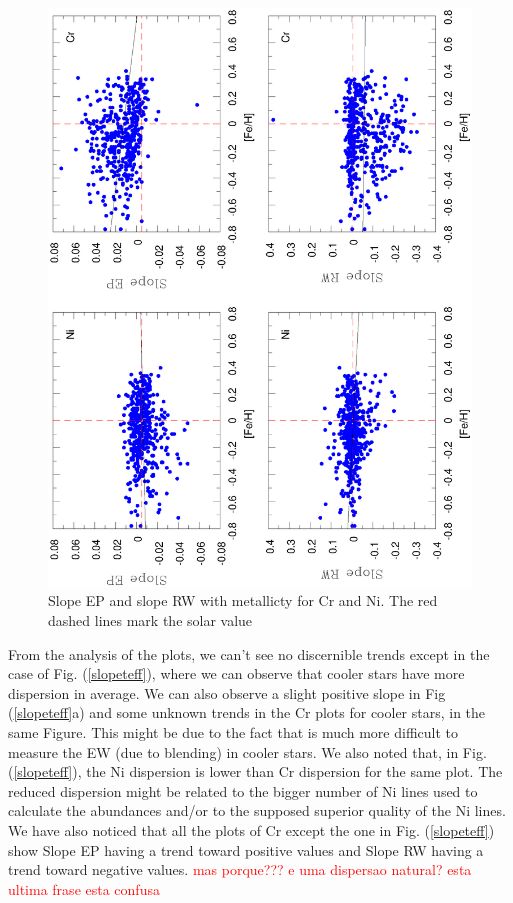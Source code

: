 \documentclass[dvips,12pt,a4paper]{report}
\begin{document}
{{\begin{figure}[h]
\centering
\includegraphics[width=10 cm, angle=-90]{pics/uncertain/feh.eps}
\caption[Slope EP and slope RW with feh for Cr and Ni]{Slope EP and slope RW with metallicty for Cr and Ni. The red dashed lines mark the solar value}
\label{slopefeh}
\end{figure}

From the analysis of the plots, we can't see no discernible trends except in the case of Fig. (\ref{slopeteff}), where we can observe that cooler stars  have more dispersion in average. We can also observe a slight positive slope in Fig (\ref{slopeteff}a) and some unknown trends in the Cr plots for cooler stars, in the same Figure. This might be due to the fact that is much more difficult to measure the EW (due to blending) in cooler stars. We also noted that, in Fig. (\ref{slopeteff}), the Ni dispersion is lower than Cr dispersion for the same plot. The reduced dispersion might be related to the bigger number of Ni lines used to calculate the abundances and/or to the supposed superior quality of the Ni lines. We have also noticed that all the plots of Cr except the one in Fig. (\ref{slopeteff}) show Slope EP having a trend toward positive values and Slope RW having a trend toward negative values. \textcolor{red}{mas porque??? e uma dispersao natural? esta ultima frase esta confusa}


}}
\end{document}
